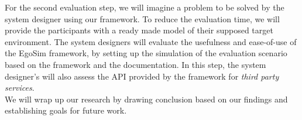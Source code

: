 For the second evaluation step, we will imagine a problem to be solved by the system designer using our framework. To reduce the evaluation time, we will provide the participants with a ready made model of their supposed target environment. The system designers will evaluate the usefulness and ease-of-use of the EgoSim framework, by setting up the simulation of the evaluation scenario based on the framework and the documentation. In this step, the system designer's will also assess the API provided by the framework for \emph{third party services}.\\


We will wrap up our research by drawing conclusion based on our findings and establishing goals for future work.



